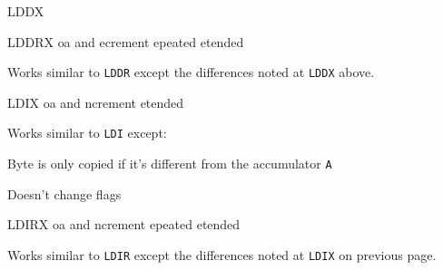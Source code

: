 \begin{basedescript}{
	\desclabelstyle{\multilinelabel}
	\desclabelwidth{3cm}}
\begin{DetailItem}{LDDX\ZXN}
		\begin{DetailTiming}
		\end{DetailTiming}

	\end{DetailItem}

	\label{DetailRefLDDRX}
	\begin{DetailItem}{LDDRX\ZXN}
		{oa\IH{D} and ecrement epeated etended}		
		{\SymLDDRX}

		Works similar to {\tt LDDR} except the differences noted at {\tt LDDX} above.

		\begin{DetailEffects}
			\FlagsLDDRX
		\end{DetailEffects}
					
		\begin{DetailTiming}
			\DetailTimeRegular[{\tt BC}=0]{4}{16}
			\DetailTimeRegular[{\tt BC}$\neq$0]{5}{21}
		\end{DetailTiming}

	\end{DetailItem}

	\label{DetailRefLDIX}
	\begin{DetailItem}{LDIX\ZXN}
		{oa and ncrement etended}		
		{\SymLDIX}

		Works similar to {\tt LDI} except:
		\begin{DetailCompactList}
			\item Byte is only copied if it's different from the accumulator {\tt A}
			\item Doesn't change flags
		\end{DetailCompactList}

		\begin{DetailEffects}
			\FlagsLDIX
		\end{DetailEffects}
				
		\begin{DetailTiming}
			\DetailTime{4}{16}
		\end{DetailTiming}

	\end{DetailItem}

	\label{DetailRefLDIRX}
	\begin{DetailItem}{LDIRX\ZXN}
		{oa and ncrement epeated etended}		
		{\SymLDIRX}

		Works similar to {\tt LDIR} except the differences noted at {\tt LDIX} on previous page.

		\begin{DetailEffects}
			\FlagsLDIRX
		\end{DetailEffects}
				

\end{DetailItem}
\end{basedescript}
